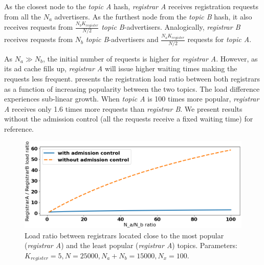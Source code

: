As the closest node to the \emph{topic A} hash, \emph{registrar A} receives registration requests from all the $N_a$ advertisers. As the furthest node from the \emph{topic B} hash, it also receives requests from $\frac{N_{b}K_\textit{register}}{N/2}$ \emph{topic B}-advertisers. Analogically, \emph{registrar B} receives requests from $N_b$ \emph{topic B}-advertisers and $\frac{N_{a}K_\textit{register}}{N/2}$ requests for \emph{topic A}.

As $N_a \gg N_b$, the initial number of requests is higher for \emph{registrar A}. However, as its ad cache fills up, \emph{registrar A} will issue higher waiting times making the requests less frequent.  presents the registration load ratio between both registrars as a function of increasing popularity between the two topics. The load difference experiences sub-linear growth. When \emph{topic A} is 100 times more popular, \emph{registrar A} receives only 1.6 times more requests than \emph{registrar B}. We present results without the admission control (\ie all the requests receive a fixed waiting time) for reference.

\begin{figure}[t]
    \includegraphics[width=1\linewidth]{img/fairness_registration}
    \vspace{-0.05in}
    \caption{Load ratio between registrars located close to the most popular (\emph{registrar A}) and the least popular (\emph{registrar A}) topics.
	\protect{} Parameters: $K_{register}=5, N=25000, N_a+N_b=15000, N_x=100$.}
    \label{fig:fairness_registration}
    \vspace{-0.15in}
\end{figure}


